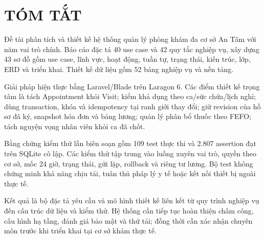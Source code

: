 \clearpage
\chapter*{TÓM TẮT}
Đề tài phân tích và thiết kế hệ thống quản lý phòng khám đa cơ sở An Tâm với năm vai trò chính.\allowbreak{} Báo cáo đặc tả 40 use case và 42 quy tắc nghiệp vụ, xây dựng 43 sơ đồ gồm use case, lĩnh vực, hoạt động, tuần tự, trạng thái, kiến trúc, lớp, ERD và triển khai.\allowbreak{} Thiết kế dữ liệu gồm 52 bảng nghiệp vụ và nền tảng.\allowbreak{}

Giải pháp hiện thực bằng Laravel/\allowbreak{}Blade trên Laragon 6.\allowbreak{} Các điểm thiết kế trọng tâm là tách Appointment khỏi Visit; kiểm khả dụng theo ca/\allowbreak{}sức chứa/\allowbreak{}lịch nghỉ; dùng transaction, khóa và idempotency tại ranh giới thay đổi; giữ revision của hồ sơ đã ký, snapshot hóa đơn và bảng lương; quản lý phân bổ thuốc theo FEFO; tách nguyện vọng nhân viên khỏi ca đã chốt.\allowbreak{}

Bằng chứng kiểm thử lần biên soạn gồm 109 test thực thi và 2.\allowbreak{}807 assertion đạt trên SQLite cô lập.\allowbreak{} Các kiểm thử tập trung vào luồng xuyên vai trò, quyền theo cơ sở, mốc 24 giờ, trạng thái, gửi lặp, rollback và riêng tư lương.\allowbreak{} Bộ test không chứng minh khả năng chịu tải, tuân thủ pháp lý y tế hoặc kết nối thiết bị ngoài thực tế.\allowbreak{}

Kết quả là bộ đặc tả yêu cầu và mô hình thiết kế liên kết từ quy trình nghiệp vụ đến cấu trúc dữ liệu và kiểm thử.\allowbreak{} Hệ thống cần tiếp tục hoàn thiện chấm công, cấu hình hạ tầng, đánh giá bảo mật và thử tải; đồng thời cần xác nhận chuyên môn trước khi triển khai tại cơ sở khám thực tế.\allowbreak{}

\clearpage\begingroup\small\tableofcontents\endgroup\clearpage{}\begingroup\small\listoffigures\endgroup\clearpage{}\begingroup\small\listoftables\endgroup\clearpage
